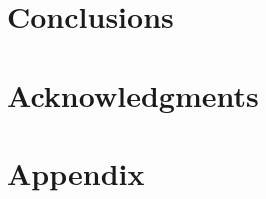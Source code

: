 \documentclass[usenatbib]{mn2e}
\begin{document}
\section{Conclusions}
\label{sec:conclusions}

\section*{Acknowledgments}  


 





\section{Appendix}
\label{sec:appendix}
\end{document}
